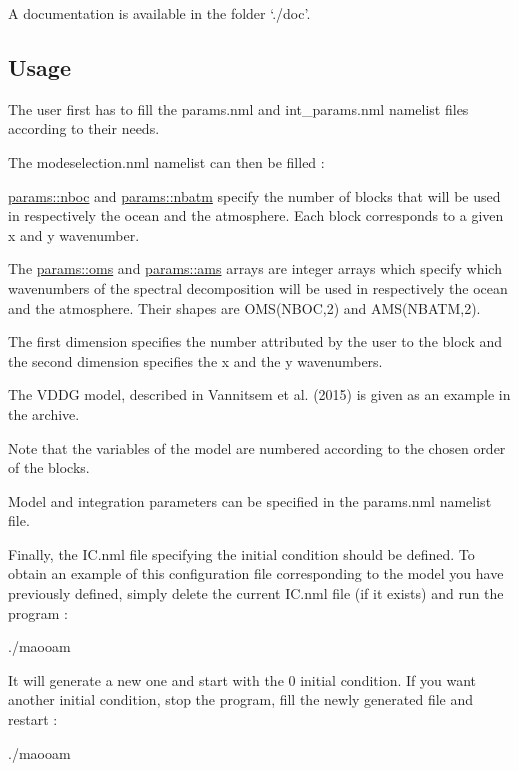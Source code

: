 A documentation is available in the folder `./doc'. 



\subsection*{Usage}

The user first has to fill the params.\-nml and int\-\_\-params.\-nml namelist files according to their needs.

The modeselection.\-nml namelist can then be filled \-:
\begin{DoxyItemize}
\item \hyperlink{classparams_a54123b5a947703d21d0c882dec6780ac}{params\-::nboc} and \hyperlink{classparams_aa5dc201b0a59d8bb25a5dc52d2ed3cac}{params\-::nbatm} specify the number of blocks that will be used in respectively the ocean and the atmosphere. Each block corresponds to a given x and y wavenumber.
\item The \hyperlink{classparams_a5e25e072992d5908eea5308243b7ec63}{params\-::oms} and \hyperlink{classparams_aa95299f1a9c54693b85e049004369089}{params\-::ams} arrays are integer arrays which specify which wavenumbers of the spectral decomposition will be used in respectively the ocean and the atmosphere. Their shapes are O\-M\-S(\-N\-B\-O\-C,2) and A\-M\-S(\-N\-B\-A\-T\-M,2).
\item The first dimension specifies the number attributed by the user to the block and the second dimension specifies the x and the y wavenumbers.
\item The V\-D\-D\-G model, described in Vannitsem et al. (2015) is given as an example in the archive.
\item Note that the variables of the model are numbered according to the chosen order of the blocks.
\end{DoxyItemize}

Model and integration parameters can be specified in the params.\-nml namelist file.

Finally, the I\-C.\-nml file specifying the initial condition should be defined. To obtain an example of this configuration file corresponding to the model you have previously defined, simply delete the current I\-C.\-nml file (if it exists) and run the program \-: \begin{DoxyVerb}./maooam
\end{DoxyVerb}


It will generate a new one and start with the 0 initial condition. If you want another initial condition, stop the program, fill the newly generated file and restart \-: \begin{DoxyVerb}./maooam
\end{DoxyVerb}


